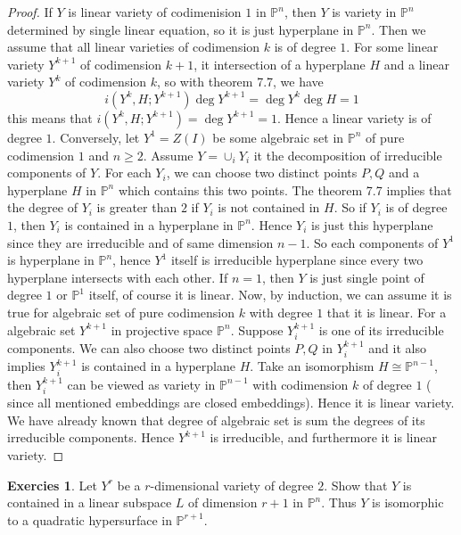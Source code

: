 \documentclass[12pt,a4paper]{article}
\theoremstyle{definition}
\newtheorem{exer}{Exercies}[section]
\begin{document}
\begin{proof}
	If $Y$ is linear variety of codimenision $1$ in $\mathbb{P}^n$, then $Y$ is variety in $\mathbb{P}^n$ determined by single linear equation, so it is just hyperplane in $\mathbb{P}^n$. Then we assume that all linear varieties of codimension $k$ is of degree $1$. For some linear variety $Y^{k+1}$ of codimension $k+1$, it intersection of a hyperplane $H$ and a linear variety $Y^k$ of codimension $k$, so with theorem 7.7, we have 
	\[
	i(Y^k,H;Y^{k+1})\deg Y^{k+1} = \deg Y^k \deg H =1
	\]
	this means that $i(Y^k,H;Y^{k+1}) = \deg Y^{k+1
	} =1$. Hence a linear variety is of degree $1$.
Conversely, let $Y^1= Z(I)$ be some algebraic set in $\mathbb{P}^n$ of pure codimension $1$ and $n \geq 2$. Assume $Y = \cup_i Y_i$ it the decomposition of irreducible components of $Y$. For each $Y_i$, we can choose two distinct points $P,Q$ and a hyperplane $H$ in $\mathbb{P}^n$ which contains this two points. The theorem 7.7 implies that the degree of $Y_i$ is greater than $2$ if $Y_i$ is not contained in $H$. So if $Y_i$ is of degree $1$, then $Y_i$ is contained in a hyperplane in $\mathbb{P}^n$. Hence $Y_i$ is just this hyperplane since they are irreducible and of same dimension $n-1$. So each components of $Y^1$ is hyperplane in $\mathbb{P}^n$, hence $Y^1$ itself is irreducible hyperplane since every two hyperplane intersects with each other. If $n=1$, then $Y$ is just single point of degree $1$ or $\mathbb{P}^1$ itself, of course it is linear. Now, by induction, we can assume it is true for algebraic set of pure codimension $k$ with degree $1$ that it is linear. For a algebraic set $Y^{k+1}$ in projective space $\mathbb{P}^n$. Suppose $Y^{k+1}_i$ is one of its irreducible components. We can also choose two distinct points $P,Q$ in $Y^{k+1}_i$ and it also implies $Y^{k+1}_i$ is contained in a hyperplane $H$. Take an isomorphism $H \cong \mathbb{P}^{n-1}$, then $Y^{k+1}_i$ can be viewed as variety in $\mathbb{P}^{n-1}$ with codimension $k$ of degree $1$ ( since all mentioned embeddings are closed embeddings). Hence it is linear variety. We have already known that degree of algebraic set is sum the degrees of its irreducible components. Hence $Y^{k+1}$ is irreducible, and furthermore it is linear variety.
\end{proof}
\begin{exer}
	Let $Y^r$ be a $r$-dimensional variety of degree $2$. Show that $Y$ is contained in a linear subspace $L$ of dimension $r+1$ in $\mathbb{P}^n$. Thus $Y$ is isomorphic to a quadratic hypersurface in $\mathbb{P}^{r+1}$.
\end{exer}
\end{document}
